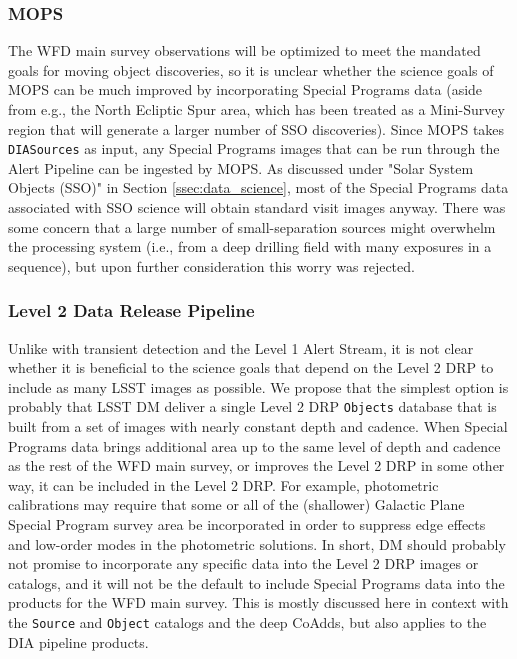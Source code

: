 \documentclass[DM,lsstdraft,toc]{lsstdoc}
\begin{document}
\subsubsection{MOPS}\label{ssec:dmplans_WFD_MOPS}

The WFD main survey observations will be optimized to meet the mandated goals for moving object discoveries, so it is unclear whether the science goals of MOPS can be much improved by incorporating Special Programs data (aside from e.g., the North Ecliptic Spur area, which has been treated as a Mini-Survey region that will generate a larger number of SSO discoveries). Since MOPS takes \texttt{DIASources} as input, any Special Programs images that can be run through the Alert Pipeline can be ingested by MOPS. As discussed under "Solar System Objects (SSO)" in Section \ref{ssec:data_science}, most of the Special Programs data associated with SSO science will obtain standard visit images anyway. There was some concern that a large number of small-separation sources might overwhelm the processing system (i.e., from a deep drilling field with many exposures in a sequence), but upon further consideration this worry was rejected.

\subsubsection{Level 2 Data Release Pipeline}\label{ssec:dmplans_WFD_L2}

Unlike with transient detection and the Level 1 Alert Stream, it is not clear whether it is beneficial to the science goals that depend on the Level 2 DRP to include as many LSST images as possible. We propose that the simplest option is probably that LSST DM deliver a single Level 2 DRP \texttt{Objects} database that is built from a set of images with nearly constant depth and cadence. When Special Programs data brings additional area up to the same level of depth and cadence as the rest of the WFD main survey, or improves the Level 2 DRP in some other way, it can be included in the Level 2 DRP. For example, photometric calibrations may require that some or all of the (shallower) Galactic Plane Special Program survey area be incorporated in order to suppress edge effects and low-order modes in the photometric solutions. In short, DM should probably not promise to incorporate any specific data into the Level 2 DRP images or catalogs, and it will not be the default to include Special Programs data into the products for the WFD main survey. This is mostly discussed here in context with the \texttt{Source} and \texttt{Object} catalogs and the deep CoAdds, but also applies to the DIA pipeline products.
\end{document}
